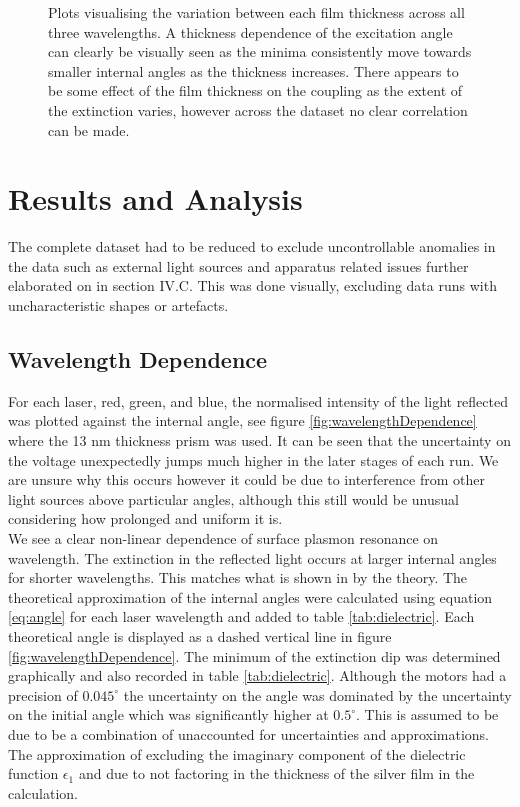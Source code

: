 \documentclass[%
reprint,
amsmath,amssymb,
aps,
]{revtex4-2}
\begin{document}
\begin{figure}[h]
			\caption{\label{fig:thicknessVariation}Plots visualising the variation between each film thickness across all three wavelengths. A thickness dependence of the excitation angle can clearly be visually seen as the minima consistently move towards smaller internal angles as the thickness increases. There appears to be some effect of the film thickness on the coupling as the extent of the extinction varies, however across the dataset no clear correlation can be made.}
		\end{figure}
		
	
	\section{Results and Analysis}
		The complete dataset had to be reduced to exclude uncontrollable anomalies in the data such as external light sources and apparatus related issues further elaborated on in section IV.C. This was done visually, excluding data runs with uncharacteristic shapes or artefacts.
		
		\subsection{Wavelength Dependence}
		
			For each laser, red, green, and blue, the normalised intensity of the light reflected was plotted against the internal angle, see figure \ref{fig:wavelengthDependence} where the 13 nm thickness prism was used. It can be seen that the uncertainty on the voltage unexpectedly jumps much higher in the later stages of each run. We are unsure why this occurs however it could be due to interference from other light sources above particular angles, although this still would be unusual considering how prolonged and uniform it is. \\
			
			We see a clear non-linear dependence of surface plasmon resonance on wavelength. The extinction in the reflected light occurs at larger internal angles for shorter wavelengths. This matches what is shown in by the theory. The theoretical approximation of the internal angles were calculated using equation \ref{eq:angle} for each laser wavelength and added to table \ref{tab:dielectric}. Each theoretical angle is displayed as a dashed vertical line in figure \ref{fig:wavelengthDependence}. The minimum of the extinction dip was determined graphically and also recorded in table \ref{tab:dielectric}. Although the motors had a precision of $0.045^\circ$ the uncertainty on the angle was dominated by the uncertainty on the initial angle which was significantly higher at $0.5^\circ$. This is assumed to be due to be a combination of unaccounted for uncertainties and approximations. The approximation of excluding the imaginary component of the dielectric function $\epsilon_1$ and due to not factoring in the thickness of the silver film in the calculation.
			
\end{document}
